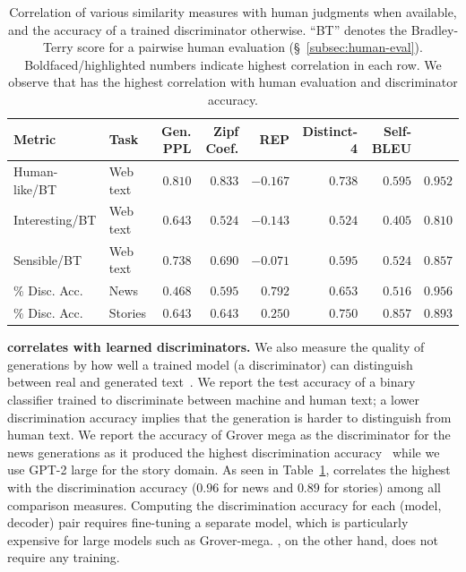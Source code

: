 \documentclass{article}
\newcommand{\myparagraph}[1]{\par\noindent\textbf{{#1}.}} %
\theoremstyle{definition}
\newcommand{\name}{{\fontfamily{bch}\selectfont{\textsc{Mauve}}}\xspace}
\newcommand{\tabemph}[1]{\cellcolor{lightmauve!30}\textcolor{black!50!royalazure}{#1}}%
\begin{document}
\begin{table}[t!]
\centering
\begin{adjustbox}{max width=0.9\textwidth}
\begin{tabular}{llrrrrrr}
\toprule
\textbf{Metric} & \textbf{Task} & \textbf{Gen. PPL} & \textbf{Zipf Coef.} & \textbf{REP} & \textbf{Distinct-4} & \textbf{Self-BLEU} & \textbf{\name} \\
\midrule
       Human-like/BT &      Web text &           $0.810$ &             $0.833$ &     $-0.167$ &             $0.738$ &            $0.595$ &        \tabemph{$\mathbf{0.952}$} \\
      Interesting/BT &      Web text &           $0.643$ &             $0.524$ &     $-0.143$ &             $0.524$ &            $0.405$ &        \tabemph{$\mathbf{0.810}$} \\
         Sensible/BT &      Web text &           $0.738$ &             $0.690$ &     $-0.071$ &             $0.595$ &            $0.524$ &        \tabemph{$\mathbf{0.857}$} \\
       \% Disc. Acc. &          News &           $0.468$ &             $0.595$ &      $0.792$ &             $0.653$ &            $0.516$ &        \tabemph{$\mathbf{0.956}$} \\
        \% Disc. Acc. &       Stories &           $0.643$ &             $0.643$ &      $0.250$ &             $0.750$ &            $0.857$ &        \tabemph{$\mathbf{0.893}$} \\
\bottomrule
\end{tabular}
 \end{adjustbox}
\caption{
Correlation of various similarity measures with human judgments when available, and the accuracy of a trained discriminator otherwise. 
``BT'' denotes the Bradley-Terry score for a pairwise human evaluation (\S~\ref{subsec:human-eval}). Boldfaced/highlighted numbers indicate highest correlation in each row. 
We observe that \name has the highest correlation with human evaluation and discriminator accuracy.
}
\label{tab:mauve:expt:gold-correlation-main}
\end{table}



\myparagraph{\name correlates with learned discriminators}
We also measure the quality of generations by how well a trained model (a discriminator) can distinguish between real and generated text~\cite{lopezpaz2017revisiting}. 
We report the test accuracy of a binary classifier trained to discriminate between machine and human text; a lower discrimination accuracy implies that the generation is harder to distinguish from human text.
We report the accuracy of 
Grover mega as the discriminator for the news generations
as it produced the highest discrimination accuracy~\cite{zellers2019grover}
while we use GPT-2 large for the story domain.
%
As seen in Table~\ref{tab:mauve:expt:gold-correlation-main}, \name correlates the highest with the discrimination accuracy ($0.96$ for news and $0.89$ for stories) among all comparison measures. 
Computing the discrimination accuracy for each (model, decoder) pair requires fine-tuning a separate model, which is particularly expensive for large models such as Grover-mega. 
\name, on the other hand, does not require any training.
\end{document}
